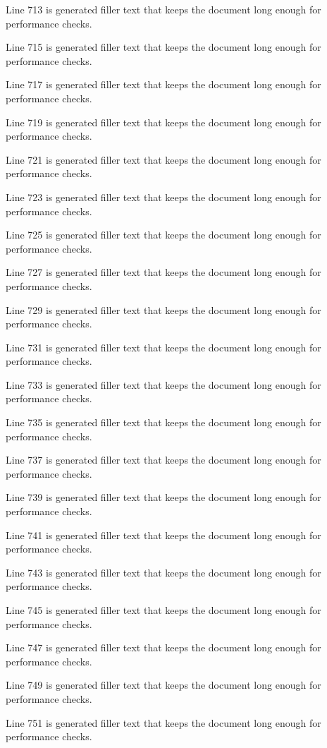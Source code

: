Line 713 is generated filler text that keeps the document long enough for performance checks.

Line 715 is generated filler text that keeps the document long enough for performance checks.

Line 717 is generated filler text that keeps the document long enough for performance checks.

Line 719 is generated filler text that keeps the document long enough for performance checks.

Line 721 is generated filler text that keeps the document long enough for performance checks.

Line 723 is generated filler text that keeps the document long enough for performance checks.

Line 725 is generated filler text that keeps the document long enough for performance checks.

Line 727 is generated filler text that keeps the document long enough for performance checks.

Line 729 is generated filler text that keeps the document long enough for performance checks.

Line 731 is generated filler text that keeps the document long enough for performance checks.

Line 733 is generated filler text that keeps the document long enough for performance checks.

Line 735 is generated filler text that keeps the document long enough for performance checks.

Line 737 is generated filler text that keeps the document long enough for performance checks.

Line 739 is generated filler text that keeps the document long enough for performance checks.

Line 741 is generated filler text that keeps the document long enough for performance checks.

Line 743 is generated filler text that keeps the document long enough for performance checks.

Line 745 is generated filler text that keeps the document long enough for performance checks.

Line 747 is generated filler text that keeps the document long enough for performance checks.

Line 749 is generated filler text that keeps the document long enough for performance checks.

Line 751 is generated filler text that keeps the document long enough for performance checks.

